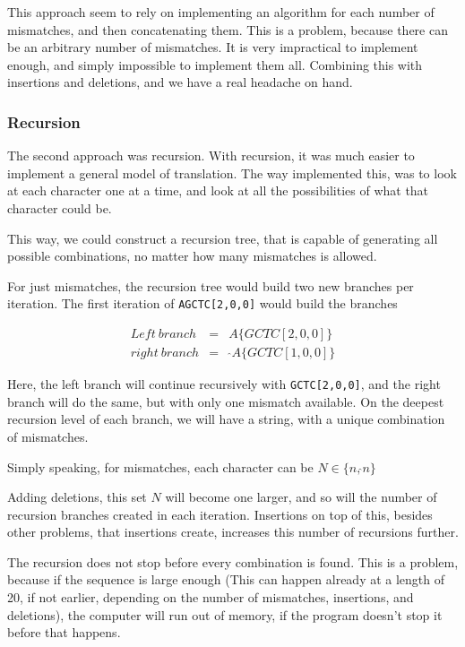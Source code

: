 \documentclass[12pt]{article}
\begin{document}
This approach seem to rely on implementing an algorithm for each number of mismatches, and then concatenating them. This is a problem, because there can be an arbitrary number of mismatches. It is very impractical to implement enough, and simply impossible to implement them all. Combining this with insertions and deletions, and we have a real headache on hand.

\subsubsection{Recursion}

The second approach was recursion. With recursion, it was much easier to implement a general model of translation. The way implemented this, was to look at each character one at a time, and look at all the possibilities of what that character could be.

This way, we could construct a recursion tree, that is capable of generating all possible combinations, no matter how many mismatches is allowed.

For just mismatches, the recursion tree would build two new branches per iteration. The first iteration of \texttt{AGCTC[2,0,0]} would build the branches

\begin{eqnarray}
	Left\ branch &=& A\{GCTC[2,0,0]\} \\
	right\ branch &=&\ \hat{}A\{GCTC[1,0,0]\}
\end{eqnarray}

Here, the left branch will continue recursively with \texttt{GCTC[2,0,0]}, and the right branch will do the same, but with only one mismatch available. On the deepest recursion level of each branch, we will have a string, with a unique combination of mismatches.

Simply speaking, for mismatches, each character can be $N \in \{n, \hat{}n\}$

Adding deletions, this set $N$ will become one larger, and so will the number of recursion branches created in each iteration. Insertions on top of this, besides other problems, that insertions create, increases this number of recursions further.

The recursion does not stop before every combination is found. This is a problem, because if the sequence is large enough (This can happen already at a length of 20, if not earlier, depending on the number of mismatches, insertions, and deletions), the computer will run out of memory, if the program doesn't stop it before that happens.
\end{document}
